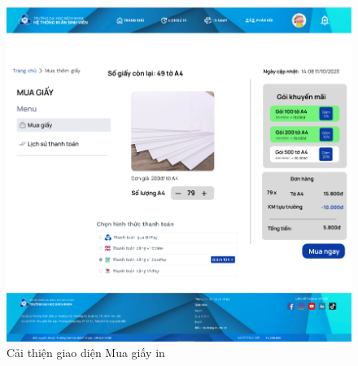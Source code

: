 \begin{itemize}
\begin{figure}[H]
\begin{center}
            \includegraphics[width=1\textwidth]{Images/Test/fix_buypaper.png}
            \caption{Cải thiện giao diện Mua giấy in}
        \end{center}
    \end{figure}
\end{itemize}
